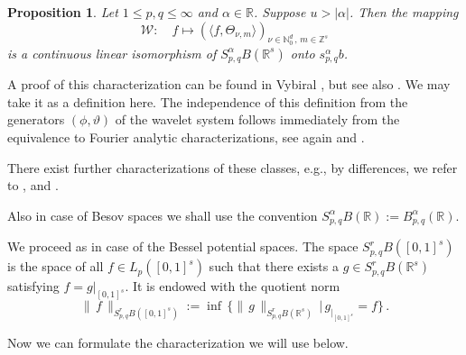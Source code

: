 \documentclass[12pt]{article}
\newtheorem{proposition}{Proposition}
\newcommand{\ZZ}{\mathbb{Z}}
\newcommand{\real}{\mathbb{R}}
\newcommand{\N}{\mathbb{N}}
\newcommand{\red}[1]{\textcolor{red}{#1}}
\begin{document}
\begin{proposition}\label{wavelet}
	Let $1\le  p,q \le\infty$ and $\alpha \in \real$. Suppose $u > |\alpha|$. 	
Then the  mapping 
\begin{equation}\label{wave}
		{\mathcal W}: \quad f \mapsto (\langle f, \Theta_{{\nu},{m}} \rangle)_{{\nu} \in \N_0^d\, , \, {m} \in \ZZ^s} 
\end{equation}
is a continuous linear isomorphism of $S^\alpha_{p,q}B(\real^s)$ onto $s^\alpha_{p,q}b$.
\end{proposition}


A proof of this characterization can be found in 
Vybiral \cite{Vy}, but  see also \cite[Thm.~1.54]{Tri10}.
We may take it as a definition here.
The independence of this definition from the generators $(\phi,\vartheta)$
of the wavelet system 
follows immediately from the equivalence to Fourier analytic characterizations, see again  \cite{Vy} and \cite{Tri10}.





There exist  further characterizations of these classes, e.g., by differences, we refer to 
\cite{ST}, \cite{Tri18} and \cite{Ul10}.

Also in case of Besov spaces we shall use the convention $S^{\alpha}_{p, q}B(\real):= B^{\alpha}_{p, q}(\real)$.

We proceed  as in  case of the Bessel potential spaces. 
The space
$S^{r}_{p,q}B([0,1]^s)$ is the space of all $f\in
   L_p([0,1]^s)$ such that there exists a $g\in
   S^{r}_{p,q}B(\real^s)$ satisfying $f = g|_{[0,1]^s}$. It is endowed  with the quotient norm
   $$
 \|\,f\,\|_{S^{r}_{p,q}B([0,1]^s)} := \inf\, \{\|\, g \,\|_{S^{r}_{p,q}B(\real^s)} \,|\, g_{|_{[0,1]^s}} =f\}\,.
   $$
 
Now we can formulate the characterization we will use below.
\end{document}
